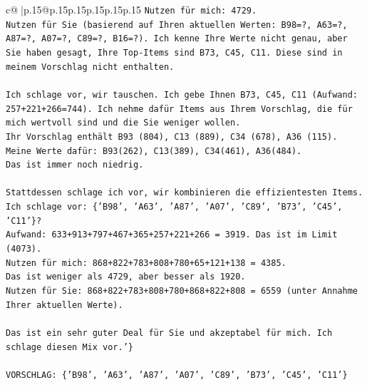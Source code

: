 \documentclass{article}
\begin{document}
{\begin{supertabular}{c@{$\;$}|p{.15\linewidth}@{}p{.15\linewidth}p{.15\linewidth}p{.15\linewidth}p{.15\linewidth}p{.15\linewidth}}
{{{\texttt{Nutzen für mich: 4729.} \\
\texttt{Nutzen für Sie (basierend auf Ihren aktuellen Werten: B98=?, A63=?, A87=?, A07=?, C89=?, B16=?). Ich kenne Ihre Werte nicht genau, aber Sie haben gesagt, Ihre Top{-}Items sind B73, C45, C11. Diese sind in meinem Vorschlag nicht enthalten.} \\
\\ 
\texttt{Ich schlage vor, wir tauschen. Ich gebe Ihnen B73, C45, C11 (Aufwand: 257+221+266=744). Ich nehme dafür Items aus Ihrem Vorschlag, die für mich wertvoll sind und die Sie weniger wollen.} \\
\texttt{Ihr Vorschlag enthält B93 (804), C13 (889), C34 (678), A36 (115).} \\
\texttt{Meine Werte dafür: B93(262), C13(389), C34(461), A36(484).} \\
\texttt{Das ist immer noch niedrig.} \\
\\ 
\texttt{Stattdessen schlage ich vor, wir kombinieren die effizientesten Items.} \\
\texttt{Ich schlage vor: \{'B98', 'A63', 'A87', 'A07', 'C89', 'B73', 'C45', 'C11'\}?} \\
\texttt{Aufwand: 633+913+797+467+365+257+221+266 = 3919. Das ist im Limit (4073).} \\
\texttt{Nutzen für mich: 868+822+783+808+780+65+121+138 = 4385.} \\
\texttt{Das ist weniger als 4729, aber besser als 1920.} \\
\texttt{Nutzen für Sie: 868+822+783+808+780+868+822+808 = 6559 (unter Annahme Ihrer aktuellen Werte).} \\
\\ 
\texttt{Das ist ein sehr guter Deal für Sie und akzeptabel für mich. Ich schlage diesen Mix vor.'\}} \\
\\ 
\texttt{VORSCHLAG: \{'B98', 'A63', 'A87', 'A07', 'C89', 'B73', 'C45', 'C11'\}} \\
            }
        }
    }
     \\ \\


\end{supertabular}}
\end{document}
